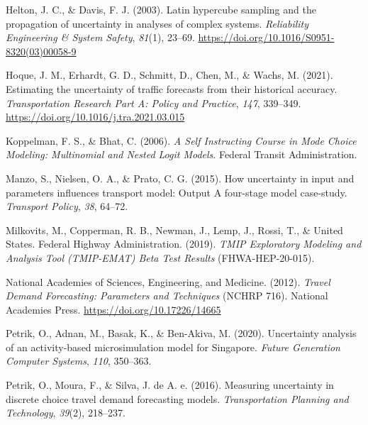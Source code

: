 \documentclass[
  letterpaper,
  authoryear,
  review,
  3p]{elsarticle}
\newlength{\cslhangindent}
\newlength{\cslentryspacingunit} %
\newenvironment{CSLReferences}[2] %
 {%
  \setlength{\parindent}{0pt}
  \ifodd #1
  \let\oldpar\par
  \def\par{\hangindent=\cslhangindent\oldpar}
  \fi
  \setlength{\parskip}{#2\cslentryspacingunit}
 }%
 {}
\begin{document}
\begin{CSLReferences}{1}{0}
\leavevmode{}%
Helton, J. C., \& Davis, F. J. (2003). Latin hypercube sampling and the
propagation of uncertainty in analyses of complex systems.
\emph{Reliability Engineering \& System Safety}, \emph{81}(1), 23--69.
\url{https://doi.org/10.1016/S0951-8320(03)00058-9}

\leavevmode{}%
Hoque, J. M., Erhardt, G. D., Schmitt, D., Chen, M., \& Wachs, M.
(2021). Estimating the uncertainty of traffic forecasts from their
historical accuracy. \emph{Transportation Research Part A: Policy and
Practice}, \emph{147}, 339--349.
\url{https://doi.org/10.1016/j.tra.2021.03.015}

\leavevmode{}%
Koppelman, F. S., \& Bhat, C. (2006). \emph{A {Self Instructing Course}
in {Mode Choice Modeling}: {Multinomial} and {Nested Logit Models}}.
{Federal Transit Administration}.

\leavevmode{}%
Manzo, S., Nielsen, O. A., \& Prato, C. G. (2015). How uncertainty in
input and parameters influences transport model: Output {A} four-stage
model case-study. \emph{Transport Policy}, \emph{38}, 64--72.

\leavevmode{}%
Milkovits, M., Copperman, R. B., Newman, J., Lemp, J., Rossi, T., \&
United States. Federal Highway Administration. (2019). \emph{{TMIP
Exploratory Modeling} and {Analysis Tool} ({TMIP-EMAT}) {Beta Test
Results}} (FHWA-HEP-20-015).

\leavevmode{}%
National Academies of Sciences, Engineering, and Medicine. (2012).
\emph{Travel {Demand Forecasting}: {Parameters} and {Techniques}} (NCHRP
716). {National Academies Press}. \url{https://doi.org/10.17226/14665}

\leavevmode{}%
Petrik, O., Adnan, M., Basak, K., \& Ben-Akiva, M. (2020). Uncertainty
analysis of an activity-based microsimulation model for {Singapore}.
\emph{Future Generation Computer Systems}, \emph{110}, 350--363.

\leavevmode{}%
Petrik, O., Moura, F., \& Silva, J. de A. e. (2016). Measuring
uncertainty in discrete choice travel demand forecasting models.
\emph{Transportation Planning and Technology}, \emph{39}(2), 218--237.


\end{CSLReferences}
\end{document}
